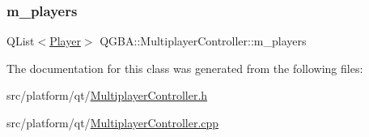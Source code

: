 \mbox{\label{class_q_g_b_a_1_1_multiplayer_controller_a0564c4f543dfa7adcdbdc70472684c99}} 
\subsubsection{\texorpdfstring{m\+\_\+players}{m\_players}}
{\footnotesize\ttfamily Q\+List$<$\mbox{\hyperlink{class_q_g_b_a_1_1_multiplayer_controller_struct_q_g_b_a_1_1_multiplayer_controller_1_1_player}{Player}}$>$ Q\+G\+B\+A\+::\+Multiplayer\+Controller\+::m\+\_\+players\hspace{0.3cm}{\ttfamily [private]}}



The documentation for this class was generated from the following files\+:\begin{DoxyCompactItemize}
\item 
src/platform/qt/\mbox{\hyperlink{_multiplayer_controller_8h}{Multiplayer\+Controller.\+h}}\item 
src/platform/qt/\mbox{\hyperlink{_multiplayer_controller_8cpp}{Multiplayer\+Controller.\+cpp}}\end{DoxyCompactItemize}
